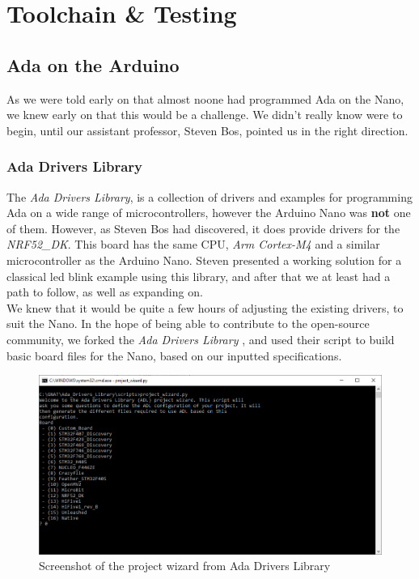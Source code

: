 \documentclass{article}
\begin{document}
\section{Toolchain \& Testing}
\subsection{Ada on the Arduino}
As we were told early on that almost noone had programmed Ada on the Nano, we knew early on that this would be a challenge. We didn't really know were to begin, until our assistant professor, Steven Bos, pointed us in the right direction. 

\subsubsection{Ada Drivers Library}

The \textit{Ada Drivers Library}, is a collection of drivers and examples for programming Ada on a wide range of microcontrollers, however the Arduino Nano was \textbf{not} one of them. However, as Steven Bos had discovered, it does provide drivers for the \textit{NRF52\_DK}. This board has the same CPU, \textit{Arm Cortex-M4} and a similar microcontroller as the Arduino Nano. Steven presented a working solution for a classical led blink example using this library, and after that we at least had a path to follow, as well as expanding on.\\ 

We knew that it would be quite a few hours of adjusting the existing drivers, to suit the Nano. In the hope of being able to contribute to the open-source community, we forked the \textit{Ada Drivers Library}
, and used their script to build basic board files for the Nano, based on our inputted specifications. 

\begin{figure}[H]
  \centering
  \includegraphics[width=\linewidth]{projectWizard.png}
  \caption{Screenshot of the project wizard from Ada Drivers Library}
  \label{projectWizard}
\end{figure}
\end{document}
